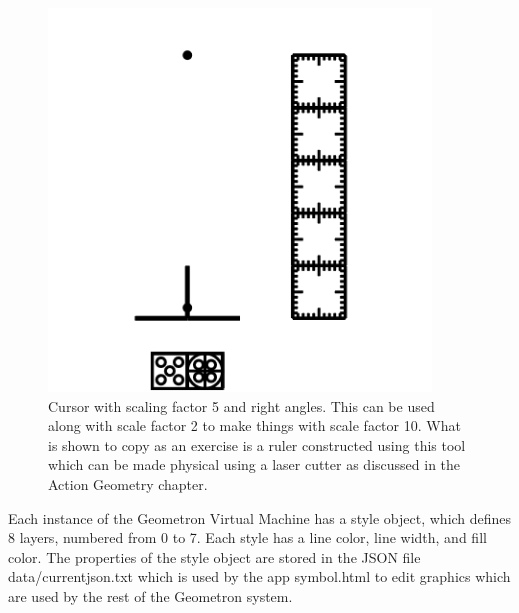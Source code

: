 \begin{figure}
	\centering
	\includegraphics[width=4in]{figures/web2d/cursor5.png}
	\caption[cursor5]
	{Cursor with scaling factor 5 and right angles. This can be used along with scale factor 2 to make things with scale factor 10.  What is shown to copy as an exercise is a ruler constructed using this tool which can be made physical using a laser cutter as discussed in the Action Geometry chapter.}
\end{figure}


Each instance of the Geometron Virtual Machine has a style object, which defines 8 layers, numbered from 0 to 7.  Each style has a line color, line width, and fill color.  The properties of the style object are stored in the JSON file data/currentjson.txt which is used by the app symbol.html to edit graphics which are used by the rest of the Geometron system.  

